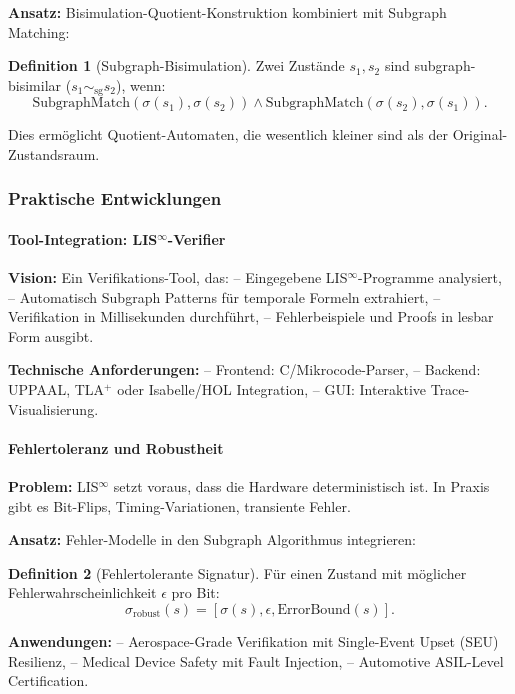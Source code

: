 \documentclass[a4paper,12pt]{article}
\theoremstyle{definition}
\newtheorem{definition}{Definition}
\begin{document}
\textbf{Ansatz:} Bisimulation-Quotient-Konstruktion kombiniert mit Subgraph Matching:

\begin{definition}[Subgraph-Bisimulation]
	Zwei Zustände $s_1, s_2$ sind subgraph-bisimilar ($s_1 \sim_{\text{sg}} s_2$), wenn:
	\[
	\text{SubgraphMatch}(\sigma(s_1), \sigma(s_2)) \land \text{SubgraphMatch}(\sigma(s_2), \sigma(s_1)).
	\]
\end{definition}

Dies ermöglicht Quotient-Automaten, die wesentlich kleiner sind als der Original-Zustandsraum.

\subsubsection{Praktische Entwicklungen}

\paragraph{Tool-Integration: LIS$^{\infty}$-Verifier}

\textbf{Vision:} Ein Verifikations-Tool, das:
-- Eingegebene LIS$^{\infty}$-Programme analysiert,
-- Automatisch Subgraph Patterns für temporale Formeln extrahiert,
-- Verifikation in Millisekunden durchführt,
-- Fehlerbeispiele und Proofs in lesbar Form ausgibt.

\textbf{Technische Anforderungen:}
-- Frontend: C/Mikrocode-Parser,
-- Backend: UPPAAL, TLA$^+$ oder Isabelle/HOL Integration,
-- GUI: Interaktive Trace-Visualisierung.

\paragraph{Fehlertoleranz und Robustheit}

\textbf{Problem:} LIS$^{\infty}$ setzt voraus, dass die Hardware deterministisch ist. In Praxis gibt es Bit-Flips, Timing-Variationen, transiente Fehler.

\textbf{Ansatz:} Fehler-Modelle in den Subgraph Algorithmus integrieren:

\begin{definition}[Fehlertolerante Signatur]
	Für einen Zustand mit möglicher Fehlerwahrscheinlichkeit $\epsilon$ pro Bit:
	\[
	\sigma_{\text{robust}}(s) = [\sigma(s), \epsilon, \text{ErrorBound}(s)].
	\]
\end{definition}

\textbf{Anwendungen:}
-- Aerospace-Grade Verifikation mit Single-Event Upset (SEU) Resilienz,
-- Medical Device Safety mit Fault Injection,
-- Automotive ASIL-Level Certification.
\end{document}

